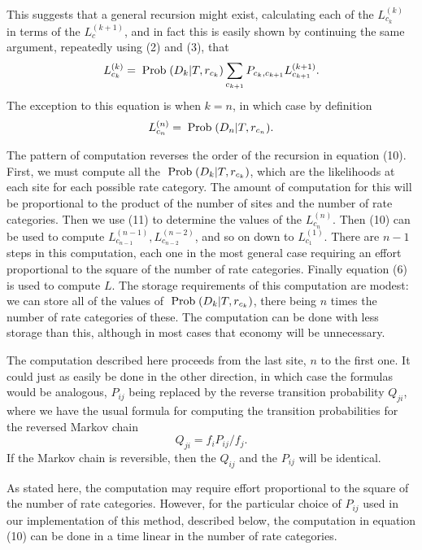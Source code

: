 \documentclass[12pt]{article}
\begin{document}
This suggests that a general recursion might exist, calculating
each of the $L_{c_k}^{(k)}$ in terms of the $L_{c}^{(k+1)}$, and in fact
this is easily shown by continuing the same argument, repeatedly using (2) and
(3), that
\begin{equation}%
L_{c_k}^{(k)} = \prob(D_k|T, r_{c_k})\sum_{c_{k+1}} P_{c_k,c_{k+1}} L_{c_{k+1}}^{(k+1)}.
\end{equation}
The exception to this equation is when $k = n$, in which case by definition
\begin{equation}%
L_{c_n}^{(n)} = \prob(D_n|T, r_{c_n}).
\end{equation}

The pattern of computation reverses the order of the recursion in equation (10).
First, we must compute all the ${\rm\;Prob\;}(D_k|T, r_{c_k})$, which are the
likelihoods at each site for each possible rate category.  The amount of
computation for this will be proportional to the product of the number of
sites and the number of rate categories.
Then we use (11) to determine the values of the $L_{c_n}^{(n)}$.  Then (10) can
be used to compute $L_{c_{n-1}}^{(n-1)}, L_{c_{n-2}}^{(n-2)}$, and so on
down to $L_{c_1}^{(1)}$.  There are $n-1$ steps in this computation, each
one in the most general case requiring an effort proportional to the square of the number of rate
categories.  Finally equation (6) is used to compute $L$.  The storage
requirements of this computation are modest: we can store all of the
values of ${\rm\;Prob\;}(D_k|T, r_{c_k})$, there being $n$ times the number of
rate categories of these.  The computation can be done with less storage than
this, although in most cases that economy will be unnecessary.

The computation described here proceeds from the last site, $n$ to the first
one.  It could just as easily be done in the other direction, in which case
the formulas would be analogous, $P_{ij}$ being replaced by the reverse
transition probability $Q_{ji}$, where we have the usual formula for
computing the transition probabilities for the reversed Markov chain
\begin{equation}%
Q_{ji} = f_i P_{ij} / f_j.
\end{equation}
If the Markov chain is reversible, then the $Q_{ij}$ and the $P_{ij}$ will
be identical.

As stated here, the computation may require effort proportional to the
square of the number of rate categories.  However, for the particular choice
of $P_{ij}$ used in our implementation of this method, described below,
the computation in equation (10) can be done in a time linear in the
number of rate categories.
\end{document}
